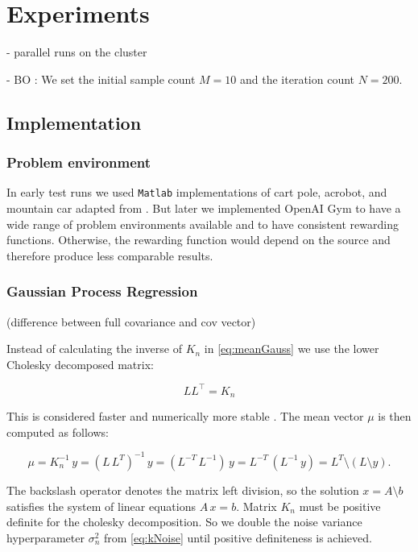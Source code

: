 \chapter{Experiments}
\label{chap:4}
%

- parallel runs on the cluster

- BO : We set the initial sample count $M = 10$ and the iteration count $N = 200$.

\section{Implementation}

\subsection{Problem environment}
In early test runs we used \texttt{Matlab} implementations of cart pole, acrobot, and mountain car adapted from \cite{joseCode}. But later we implemented OpenAI Gym to have a wide range of problem environments available and to have consistent rewarding functions. Otherwise, the rewarding function would depend on the source and therefore produce less comparable results.



\subsection{Gaussian Process Regression}

(difference between full covariance and cov vector)

Instead of calculating the inverse of $K_n$ in \eqref{eq:meanGauss} we use the lower Cholesky decomposed matrix:

$$LL^\top=K_n$$

This is considered faster and numerically more stable \cite{rasmussen2006gaussian}. The mean vector $\mu$ is then computed as follows:

\begin{equation} \label{eq:regression}
    \mu = K_n^{-1}\,y = (L\,L^{T})^{-1}\,y = (L^{-T}\,L^{-1})\,y = L^{-T}\,(L^{-1}\,y) = L^{T}\setminus(L \setminus y).
\end{equation}

The backslash operator denotes the matrix left division, so the solution $x=A\setminus b$ satisfies the system of linear equations $A\,x=b$.
Matrix $K_n$ must be positive definite for the cholesky decomposition. So we double the noise variance hyperparameter $\sigma_n^2$ from \eqref{eq:kNoise} until positive definiteness is achieved.

